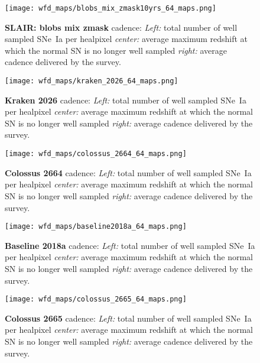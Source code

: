 \begin{figure}[!htbp]
  \begin{center}
    \texttt{[image: wfd\_maps/blobs\_mix\_zmask10yrs\_64\_maps.png]}
    \caption{{\bf SLAIR: blobs mix zmask} cadence: {\em Left:} total number of well
      sampled SNe~Ia per healpixel {\em center:} average maximum
      redshift at which the normal SN is no longer well sampled {\em
        right:} average cadence delivered by the survey.}
    \label{fig:blobs_mix_zmask}
  \end{center}
\end{figure}

\begin{figure}[!htbp]
  \begin{center}
    \texttt{[image: wfd\_maps/kraken\_2026\_64\_maps.png]}
    \caption{{\bf Kraken 2026} cadence: {\em Left:} total number of well
      sampled SNe~Ia per healpixel {\em center:} average maximum
      redshift at which the normal SN is no longer well sampled {\em
        right:} average cadence delivered by the survey.}
  \end{center}
  \label{fig:kraken_2026}
\end{figure}

\begin{figure}[!htbp]
  \begin{center}
    \texttt{[image: wfd\_maps/colossus\_2664\_64\_maps.png]}
    \caption{{\bf Colossus 2664} cadence: {\em Left:} total number of well
      sampled SNe~Ia per healpixel {\em center:} average maximum
      redshift at which the normal SN is no longer well sampled {\em
        right:} average cadence delivered by the survey.}
    \label{fig:colossus_2664}
  \end{center}
\end{figure}

\begin{figure}[!htbp]
  \begin{center}
    \texttt{[image: wfd\_maps/baseline2018a\_64\_maps.png]}
    \caption{{\bf Baseline 2018a} cadence: {\em Left:} total number of well
      sampled SNe~Ia per healpixel {\em center:} average maximum
      redshift at which the normal SN is no longer well sampled {\em
        right:} average cadence delivered by the survey.}
  \end{center}
  \label{fig:baseline2018}
\end{figure}

\begin{figure}[!htbp]
  \begin{center}
    \texttt{[image: wfd\_maps/colossus\_2665\_64\_maps.png]}
    \caption{{\bf Colossus 2665} cadence: {\em Left:} total number of well
      sampled SNe~Ia per healpixel {\em center:} average maximum
      redshift at which the normal SN is no longer well sampled {\em
        right:} average cadence delivered by the survey.}
  \end{center}
  \label{fig:colossus_2665}
\end{figure}

